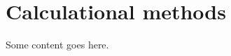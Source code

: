 \chapter{Calculational methods}
\label{MethodsAppendix}
\graphicspath{{Figures/MethodsAppendix/}{Figures/Common/}}

Some content goes here.

